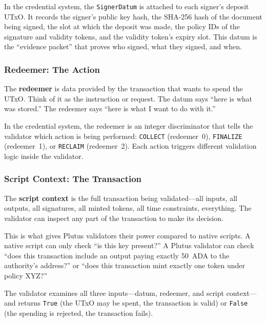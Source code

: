 In the credential system, the \texttt{SignerDatum} is attached to each
signer's deposit UTxO. It records the signer's public key hash, the
SHA-256 hash of the document being signed, the slot at which the
deposit was made, the policy IDs of the signature and validity tokens,
and the validity token's expiry slot. This datum is the ``evidence
packet'' that proves who signed, what they signed, and when.

\subsubsection{Redeemer: The Action}

The \textbf{redeemer} is data provided by the transaction that wants to
spend the UTxO. Think of it as the instruction or request. The datum
says ``here is what was stored.'' The redeemer says ``here is what I
want to do with it.''

In the credential system, the redeemer is an integer discriminator that
tells the validator which action is being performed: \texttt{COLLECT}
(redeemer~0), \texttt{FINALIZE} (redeemer~1), or \texttt{RECLAIM}
(redeemer~2). Each action triggers different validation logic inside the
validator.

\subsubsection{Script Context: The Transaction}

The \textbf{script context} is the full transaction being validated---all
inputs, all outputs, all signatures, all minted tokens, all time
constraints, everything. The validator can inspect any part of the
transaction to make its decision.

This is what gives Plutus validators their power compared to native
scripts. A native script can only check ``is this key present?'' A
Plutus validator can check ``does this transaction include an output
paying exactly 50~ADA to the authority's address?'' or ``does this
transaction mint exactly one token under policy XYZ?''

The validator examines all three inputs---datum, redeemer, and script
context---and returns \texttt{True} (the UTxO may be spent, the
transaction is valid) or \texttt{False} (the spending is rejected, the
transaction fails).

